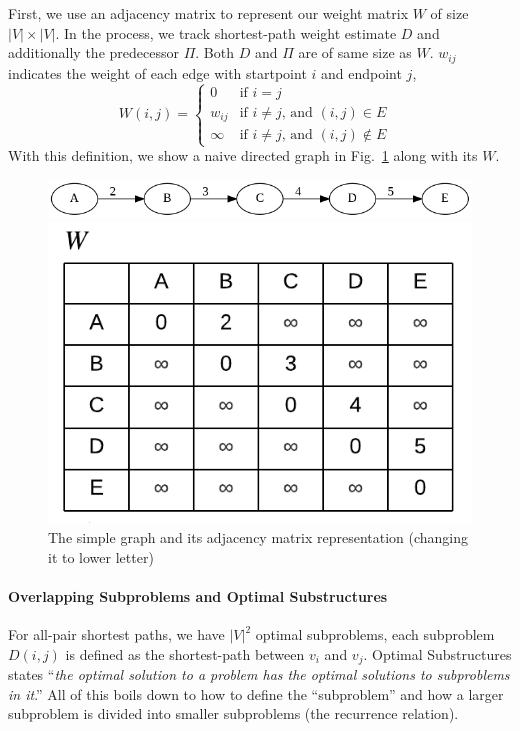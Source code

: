 \documentclass[../main.tex]{subfiles}
\begin{document}
First, we use an adjacency matrix to represent our weight matrix $W$ of size $|V|\times |V|$. In the process, we track shortest-path weight estimate $D$ and additionally the predecessor $\Pi$. Both $D$ and $\Pi$ are of same size as $W$. $w_{ij}$ indicates the weight of each edge with startpoint $i$ and endpoint $j$, 
\begin{equation}
     W{(i, j)} = \left\{ 
    \begin{array}{lll}
   0 & \mbox{if   } i=j  \\
   w_{ij} & \mbox{if $i\ne j$, and  $(i, j)\in E$ } \\
    \infty & \mbox{if $i\ne j$, and  $(i, j)\notin E$ }
    \end{array}
    \right.
\end{equation}
With this definition, we show a naive directed graph in Fig.~\ref{fig:naive_graph} along with its $W$. 
\begin{figure}[!ht]
    \centering
    \includegraphics[width=0.9\columnwidth]{fig/naive_graph.png}
    
    \includegraphics[width=0.4\columnwidth]{fig/DP_shortest_paths.png}
        \caption{The simple graph and its adjacency matrix representation (changing it to lower letter)}
    \label{fig:naive_graph}
\end{figure}

\paragraph{Overlapping Subproblems and Optimal Substructures} For all-pair shortest paths, we have $|V|^2$ optimal subproblems, each subproblem $D{(i,j)}$ is defined as the shortest-path between $v_i$ and $v_j$. Optimal Substructures states ``\textit{the optimal solution to a problem has the optimal solutions to subproblems in it}.'' 
All of this boils down to how to define the ``subproblem'' and how a larger subproblem is divided into smaller subproblems (the recurrence relation).
\end{document}
